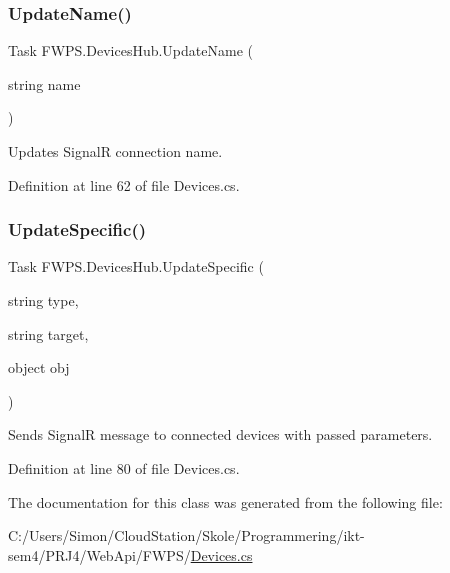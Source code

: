 \subsubsection{\texorpdfstring{Update\+Name()}{UpdateName()}}
{\footnotesize\ttfamily Task F\+W\+P\+S.\+Devices\+Hub.\+Update\+Name (\begin{DoxyParamCaption}\item[{string}]{name }\end{DoxyParamCaption})}



Updates SignalR connection name. 



Definition at line 62 of file Devices.\+cs.

\mbox{\label{class_f_w_p_s_1_1_devices_hub_a2922367d72f85098f4ae8fc883f81c05}} 
\subsubsection{\texorpdfstring{Update\+Specific()}{UpdateSpecific()}}
{\footnotesize\ttfamily Task F\+W\+P\+S.\+Devices\+Hub.\+Update\+Specific (\begin{DoxyParamCaption}\item[{string}]{type,  }\item[{string}]{target,  }\item[{object}]{obj }\end{DoxyParamCaption})}



Sends SignalR message to connected devices with passed parameters. 



Definition at line 80 of file Devices.\+cs.



The documentation for this class was generated from the following file\+:\begin{DoxyCompactItemize}
\item 
C\+:/\+Users/\+Simon/\+Cloud\+Station/\+Skole/\+Programmering/ikt-\/sem4/\+P\+R\+J4/\+Web\+Api/\+F\+W\+P\+S/\mbox{\hyperlink{_devices_8cs}{Devices.\+cs}}\end{DoxyCompactItemize}
